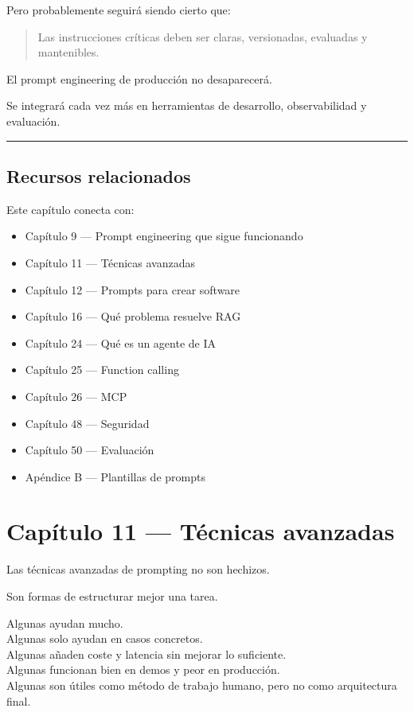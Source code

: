 Pero probablemente seguirá siendo cierto que:

\begin{quote}
Las instrucciones críticas deben ser claras, versionadas, evaluadas y
mantenibles.
\end{quote}

El prompt engineering de producción no desaparecerá.

Se integrará cada vez más en herramientas de desarrollo, observabilidad
y evaluación.

\begin{center}\rule{0.5\linewidth}{0.5pt}\end{center}

\section{Recursos relacionados}\label{recursos-relacionados-9}

Este capítulo conecta con:

\begin{itemize}
\tightlist
\item
  Capítulo 9 --- Prompt engineering que sigue funcionando
\item
  Capítulo 11 --- Técnicas avanzadas
\item
  Capítulo 12 --- Prompts para crear software
\item
  Capítulo 16 --- Qué problema resuelve RAG
\item
  Capítulo 24 --- Qué es un agente de IA
\item
  Capítulo 25 --- Function calling
\item
  Capítulo 26 --- MCP
\item
  Capítulo 48 --- Seguridad
\item
  Capítulo 50 --- Evaluación
\item
  Apéndice B --- Plantillas de prompts
\end{itemize}

\newpage

\chapter{Capítulo 11 --- Técnicas
avanzadas}\label{capuxedtulo-11-tuxe9cnicas-avanzadas}

Las técnicas avanzadas de prompting no son hechizos.

Son formas de estructurar mejor una tarea.

Algunas ayudan mucho.\\
Algunas solo ayudan en casos concretos.\\
Algunas añaden coste y latencia sin mejorar lo suficiente.\\
Algunas funcionan bien en demos y peor en producción.\\
Algunas son útiles como método de trabajo humano, pero no como
arquitectura final.

